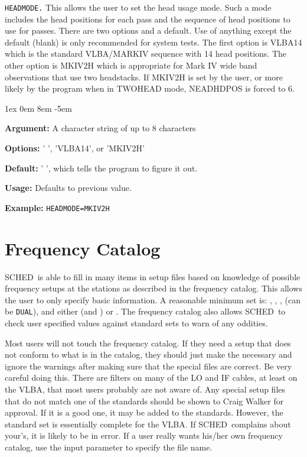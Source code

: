 \documentclass{report}
\newcommand{\schedb}{{\sc SCHED~}}
\newcommand{\rcwbox}[5]{
  \begin{list}{}{\parsep 1ex  \itemsep 0em
                 \leftmargin 8em  \itemindent -5em }
    \item {\bf Argument:} #1
    \item {\bf Options:}  #2
    \item {\bf Default:}  #3
    \item {\bf Usage:}    #4
    \item {\bf Example:}  #5
  \end{list}
}
\begin{document}
{\tt HEADMODE.}  This allows the user to set the head usage mode.
Such a mode includes the head positions for each pass and the
sequence of head positions to use for passes.  There are two options
and a default.  Use of anything except the default (blank) is only recommended
for system tests.  The first option is VLBA14 which is the standard
VLBA/MARKIV sequence with 14 head positions.  The other option is
MKIV2H which is appropriate for Mark IV wide band observations that
use two headstacks.  If MKIV2H is set by the user, or more likely by
the program when in TWOHEAD mode, NEADHDPOS is forced to 6.

\rcwbox
{A character string of up to 8 characters}
{' ', 'VLBA14', or 'MKIV2H'}
{' ', which tells the program to figure it out.}
{Defaults to previous value.}
{{\tt HEADMODE=MKIV2H}}

\section{\label{SEC:FRQCAT}Frequency Catalog}

\schedb is able to fill in many items in setup files based on
knowledge of possible frequency setups at the stations as described in
the frequency catalog.  This allows the user to only specify basic
information.  A reasonable minimum set is: , ,
,  (can be
{\tt DUAL}), and either  (and
) or .
The frequency catalog also allows \schedb to check user specified
values against standard sets to warn of any oddities.

Most users will not touch the frequency catalog.  If they need a setup
that does not conform to what is in the catalog, they should just make
the necessary  and ignore the
warnings after making sure that the special files are correct.  Be
very careful doing this.  There are filters on many of the LO and IF
cables, at least on the VLBA, that most users probably are not aware
of.  Any special setup files that do not match one of the standards
should be shown to Craig Walker for approval.  If it is a good one, it
may be added to the standards.  However, the standard set is
essentially complete for the VLBA.  If \schedb complains about your's,
it is likely to be in error.  If a user really wants his/her own
frequency catalog, use the input parameter
 to specify the file name.
\end{document}
